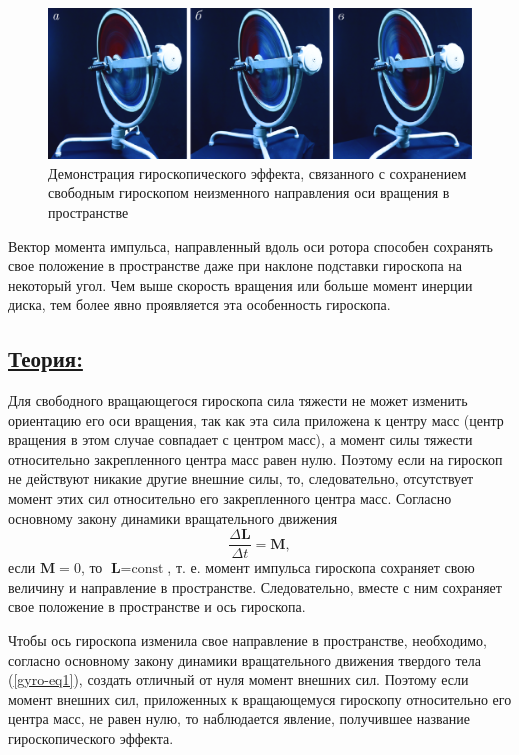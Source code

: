 \documentclass[14pt,a4paper,oneside]{extarticle}	%
\begin{document}
		\begin{figure}[H]
		\centering 		
		\includegraphics[width=0.9\linewidth]{gyro-2.png}		
		\caption{Демонстрация гироскопического эффекта, связанного с сохранением свободным гироскопом неизменного направления оси вращения в пространстве}
		\label{gyro-2}	
	\end{figure}

Вектор момента импульса, направленный вдоль оси ротора способен сохранять свое положение в пространстве даже при наклоне подставки гироскопа на некоторый угол.
Чем выше скорость вращения или больше момент инерции диска, тем более явно проявляется эта особенность гироскопа.

	\newpage
	\subsection*{\underline{Теория:}}
	
	Для свободного вращающегося гироскопа сила тяжести не может изменить ориентацию его оси вращения, так как эта сила приложена к центру масс (центр вращения в этом случае совпадает с центром масс), а момент силы тяжести относительно закрепленного центра масс равен нулю.
	Поэтому если на гироскоп не действуют никакие другие внешние силы, то, следовательно, отсутствует момент этих сил относительно его закрепленного центра масс.
	Согласно основному закону динамики вращательного движения
\begin{equation}\label{gyro-eq1}
	\frac{\Delta \textbf{L}}{\Delta t} = \textbf{M},
	\end{equation} 
	если $ \textbf{M}=0 $, то $ \textbf{L} = \text{const} $, т. е. момент импульса гироскопа сохраняет свою величину и направление в пространстве.
	Следовательно, вместе с ним сохраняет свое положение в пространстве и ось гироскопа.
		
	Чтобы ось гироскопа изменила свое направление в пространстве, необходимо, согласно основному закону динамики вращательного движения твердого тела (\ref{gyro-eq1}), создать отличный от нуля момент внешних сил.
	Поэтому если момент внешних сил, приложенных к вращающемуся гироскопу относительно его центра масс, не равен нулю, то наблюдается явление, получившее название гироскопического эффекта.
	
\end{document}
